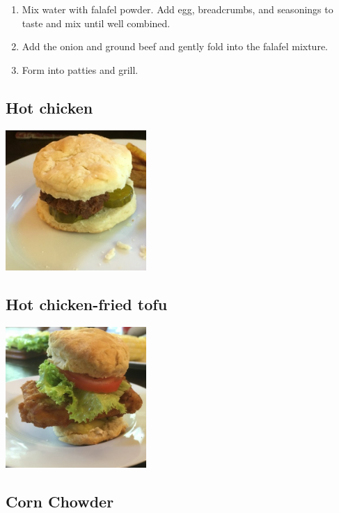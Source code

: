 \documentclass[
]{book}
\begin{document}
\begin{enumerate}
\def\labelenumi{\arabic{enumi}.}
\item
  Mix water with falafel powder. Add egg, breadcrumbs, and seasonings to taste and mix until well combined.
\item
  Add the onion and ground beef and gently fold into the falafel mixture.
\item
  Form into patties and grill.
\end{enumerate}

\hypertarget{hotchicken}{%
\subsection*{Hot chicken}\label{hotchicken}}

\includegraphics[width=0.4\textwidth,height=\textheight]{hot_chicken_small.jpg}

\hypertarget{hottofu}{%
\subsection*{Hot chicken-fried tofu}\label{hottofu}}

\includegraphics[width=0.4\textwidth,height=\textheight]{hot_chicken_tofu_small.jpg}

\hypertarget{cornchowder}{%
\subsection*{Corn Chowder}\label{cornchowder}}
\end{document}
